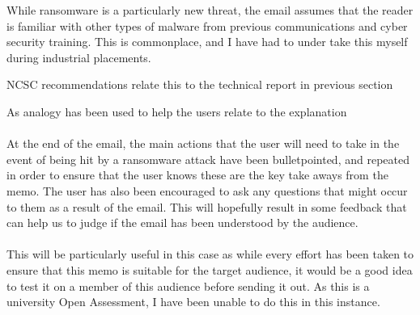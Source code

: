 \documentclass{article}
\begin{document}
While ransomware is a particularly new threat, the email assumes that the reader is familiar with other types of malware from previous communications and cyber security training.
This is commonplace, and I have had to under take this myself during industrial placements.

NCSC recommendations
relate this to the technical report in previous section

As analogy has been used to help the users relate to the explanation
\\\\
At the end of the email, the main actions that the user will need to take in the event of being hit by a ransomware attack have been bulletpointed, and repeated in order to ensure that the user knows these are the key take aways from the memo.
The user has also been encouraged to ask any questions that might occur to them as a result of the email. This will hopefully result in some feedback that can help us to judge if the email has been understood by the audience.
\\\\
This will be particularly useful in this case as while every effort has been taken to ensure that this memo is suitable for the target audience, it would be a good idea to test it on a member of this audience before sending it out. As this is a university Open Assessment, I have been unable to do this in this instance.

\newpage
\raggedright
{}

\end{document}

